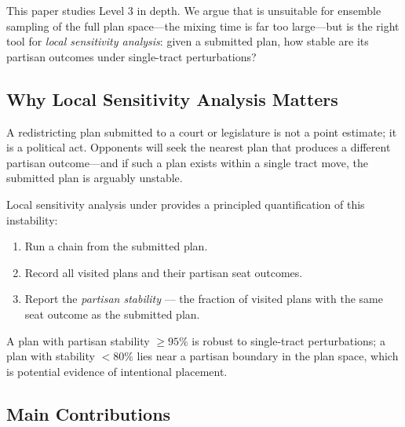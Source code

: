 This paper studies Level 3 in depth.
We argue that \flip{} is unsuitable for ensemble sampling of the full plan
space---the mixing time is far too large---but is the right tool for
\emph{local sensitivity analysis}: given a submitted plan, how stable are
its partisan outcomes under single-tract perturbations?

\subsection{Why Local Sensitivity Analysis Matters}

A redistricting plan submitted to a court or legislature is not a point
estimate; it is a political act.
Opponents will seek the nearest plan that produces a different partisan
outcome---and if such a plan exists within a single tract move, the submitted
plan is arguably unstable.

Local sensitivity analysis under \flip{} provides a principled quantification
of this instability:
\begin{enumerate}
  \item Run a \flip{} chain from the submitted plan.
  \item Record all visited plans and their partisan seat outcomes.
  \item Report the \emph{partisan stability} --- the fraction of visited plans
        with the same seat outcome as the submitted plan.
\end{enumerate}
A plan with partisan stability $\geq 95\%$ is robust to single-tract
perturbations; a plan with stability $< 80\%$ lies near a partisan boundary
in the plan space, which is potential evidence of intentional placement.

\subsection{Main Contributions}


